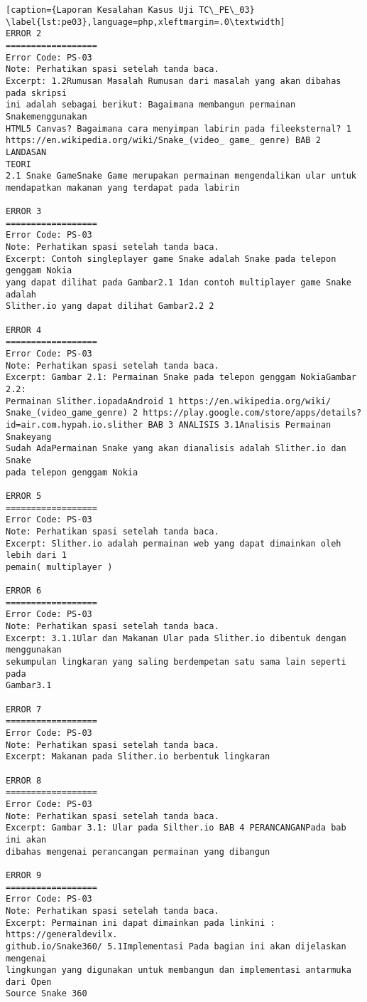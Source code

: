 \begin{enumerate}
\begin{lstlisting}[caption={Laporan Kesalahan Kasus Uji TC\_PE\_03}	\label{lst:pe03},language=php,xleftmargin=.0\textwidth]
ERROR 2
==================
Error Code: PS-03
Note: Perhatikan spasi setelah tanda baca.
Excerpt: 1.2Rumusan Masalah Rumusan dari masalah yang akan dibahas pada skripsi 
ini adalah sebagai berikut: Bagaimana membangun permainan Snakemenggunakan 
HTML5 Canvas? Bagaimana cara menyimpan labirin pada fileeksternal? 1 
https://en.wikipedia.org/wiki/Snake_(video_ game_ genre) BAB 2 LANDASAN 
TEORI 
2.1 Snake GameSnake Game merupakan permainan mengendalikan ular untuk 
mendapatkan makanan yang terdapat pada labirin

ERROR 3
==================
Error Code: PS-03
Note: Perhatikan spasi setelah tanda baca.
Excerpt: Contoh singleplayer game Snake adalah Snake pada telepon genggam Nokia 
yang dapat dilihat pada Gambar2.1 1dan contoh multiplayer game Snake adalah 
Slither.io yang dapat dilihat Gambar2.2 2 

ERROR 4
==================
Error Code: PS-03
Note: Perhatikan spasi setelah tanda baca.
Excerpt: Gambar 2.1: Permainan Snake pada telepon genggam NokiaGambar 2.2: 
Permainan Slither.iopadaAndroid 1 https://en.wikipedia.org/wiki/
Snake_(video_game_genre) 2 https://play.google.com/store/apps/details?
id=air.com.hypah.io.slither BAB 3 ANALISIS 3.1Analisis Permainan Snakeyang 
Sudah AdaPermainan Snake yang akan dianalisis adalah Slither.io dan Snake 
pada telepon genggam Nokia 

ERROR 5
==================
Error Code: PS-03
Note: Perhatikan spasi setelah tanda baca.
Excerpt: Slither.io adalah permainan web yang dapat dimainkan oleh lebih dari 1 
pemain( multiplayer )

ERROR 6
==================
Error Code: PS-03
Note: Perhatikan spasi setelah tanda baca.
Excerpt: 3.1.1Ular dan Makanan Ular pada Slither.io dibentuk dengan menggunakan 
sekumpulan lingkaran yang saling berdempetan satu sama lain seperti pada 
Gambar3.1

ERROR 7
==================
Error Code: PS-03
Note: Perhatikan spasi setelah tanda baca.
Excerpt: Makanan pada Slither.io berbentuk lingkaran

ERROR 8
==================
Error Code: PS-03
Note: Perhatikan spasi setelah tanda baca.
Excerpt: Gambar 3.1: Ular pada Silther.io BAB 4 PERANCANGANPada bab ini akan 
dibahas mengenai perancangan permainan yang dibangun

ERROR 9
==================
Error Code: PS-03
Note: Perhatikan spasi setelah tanda baca.
Excerpt: Permainan ini dapat dimainkan pada linkini : https://generaldevilx.
github.io/Snake360/ 5.1Implementasi Pada bagian ini akan dijelaskan mengenai 
lingkungan yang digunakan untuk membangun dan implementasi antarmuka dari Open 
Source Snake 360


\end{lstlisting}
\end{enumerate}
